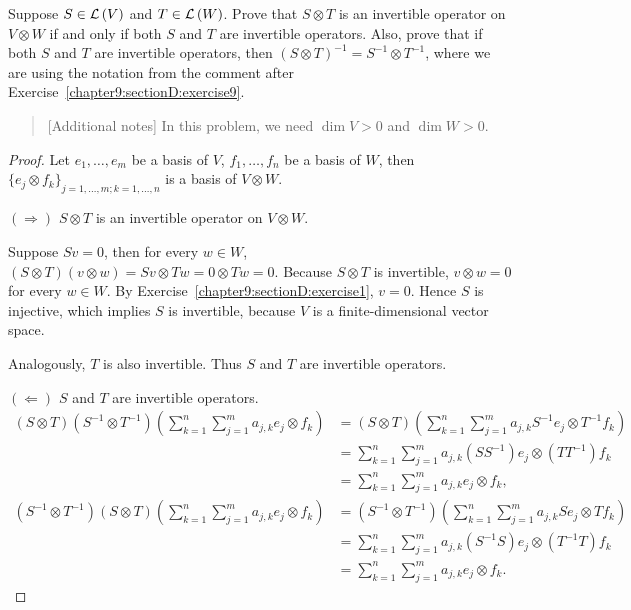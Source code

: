 \begin{exercise}\label{chapter9:sectionD:exercise10}
    Suppose $S\in\mathcal{L}\left({V}\right)$ and $T\in\mathcal{L}\left({W}\right)$. Prove that $S\otimes T$ is an invertible operator on $V\otimes W$ if and only if both $S$ and $T$ are invertible operators. Also, prove that if both $S$ and $T$ are invertible operators, then ${(S\otimes T)}^{-1} = S^{-1}\otimes T^{-1}$, where we are using the notation from the comment after Exercise~\ref{chapter9:sectionD:exercise9}.
\end{exercise}

\begin{quote}[Additional notes]
    In this problem, we need $\dim V > 0$ and $\dim W > 0$.
\end{quote}

\begin{proof}
    Let $e_{1}, \ldots, e_{m}$ be a basis of $V$, $f_{1}, \ldots, f_{n}$ be a basis of $W$, then ${\{e_{j}\otimes f_{k}\}}_{j=1,\ldots,m;k=1,\ldots,n}$ is a basis of $V\otimes W$.

    $(\Rightarrow)$ $S\otimes T$ is an invertible operator on $V\otimes W$.

    Suppose $Sv = 0$, then for every $w\in W$, $(S\otimes T)(v\otimes w) = Sv\otimes Tw = 0\otimes Tw = 0$. Because $S\otimes T$ is invertible, $v\otimes w = 0$ for every $w\in W$. By Exercise~\ref{chapter9:sectionD:exercise1}, $v = 0$. Hence $S$ is injective, which implies $S$ is invertible, because $V$ is a finite-dimensional vector space.

    Analogously, $T$ is also invertible. Thus $S$ and $T$ are invertible operators.

    \bigskip
    $(\Leftarrow)$ $S$ and $T$ are invertible operators.
    \begin{align*}
        (S\otimes T)(S^{-1}\otimes T^{-1})\left(\sum^{n}_{k=1}\sum^{m}_{j=1}a_{j,k}e_{j}\otimes f_{k}\right) & = (S\otimes T)\left(\sum^{n}_{k=1}\sum^{m}_{j=1}a_{j,k}S^{-1}e_{j}\otimes T^{-1}f_{k}\right) \\
                                                                                                             & = \sum^{n}_{k=1}\sum^{m}_{j=1}a_{j,k} (SS^{-1})e_{j}\otimes (TT^{-1})f_{k}                   \\
                                                                                                             & = \sum^{n}_{k=1}\sum^{m}_{j=1}a_{j,k}e_{j}\otimes f_{k},                                     \\
        (S^{-1}\otimes T^{-1})(S\otimes T)\left(\sum^{n}_{k=1}\sum^{m}_{j=1}a_{j,k}e_{j}\otimes f_{k}\right) & = (S^{-1}\otimes T^{-1})\left(\sum^{n}_{k=1}\sum^{m}_{j=1}a_{j,k}Se_{j}\otimes Tf_{k}\right) \\
                                                                                                             & = \sum^{n}_{k=1}\sum^{m}_{j=1}a_{j,k}(S^{-1}S)e_{j}\otimes (T^{-1}T)f_{k}                    \\
                                                                                                             & = \sum^{n}_{k=1}\sum^{m}_{j=1}a_{j,k}e_{j}\otimes f_{k}.
    \end{align*}


\end{proof}
